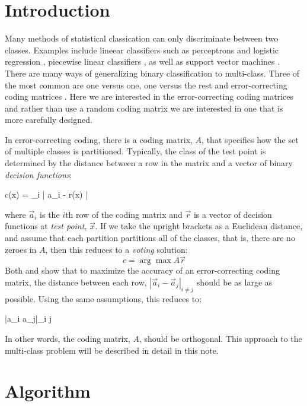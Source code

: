 
\section{Introduction}

Many methods of statistical classication can only discriminate between two classes. 
Examples include lineear classifiers such as perceptrons and logistic regression \citep{Michie_etal1994}, 
piecewise linear classifiers \citep{Herman_Yeung1992,Mills2011},
as well as support vector machines \citep{kernel_intro}.
There are many ways of generalizing binary classification to 
multi-class.
Three of the most common are one versus one, one versus the rest and 
error-correcting coding matrices \citep{Hsu_Lin2002}.
Here we are interested in the error-correcting coding matrices
\citep{Dietterich_Bakiri1995, Windeatt_Ghaderi2002} and
rather than use a random coding matrix we are interested in one that is
more carefully designed.

In error-correcting coding, there is a coding matrix, $A$, that specifies
how the set of multiple classes is partitioned.
Typically, the class of the test point is determined by the distance between
a row in the matrix and a vector of binary {\it decision functions}:
\begin{eqnnon}
	c(\vec x) = \arg \min_i | \vec a_i - \vec r(\vec x) |
	\label{min_dist}
\end{eqnnon}
where $\vec a_i$ is the $i$th row of the coding matrix and $\vec r$
is a vector of decision functions at {\it test point}, $\vec x$.
If we take the upright brackets as a Euclidean distance, and assume that
each partition partitions all of the classes, that is, there are no zeroes
in $A$, then this reduces to a {\it voting} solution:
\begin{equation}
	c = \arg \max A \vec r \label{voting}
\end{equation}
Both \citet{Allwein_etal2000} and \citet{Windeatt_Ghaderi2002} show that to
maximize the accuracy of an error-correcting coding matrix, the distance
between each row, $|\vec a_i - \vec a_j|_{i \ne j}$ should be as
large as possible.
Using the same assumptions, this reduces to:
\begin{eqnnon}
	\min |\vec a_i \cdot \vec a_j|_{i \ne j}
\end{eqnnon}
In other words, the coding matrix, $A$, should be orthogonal.
This approach to the multi-class problem will be described in detail in this note.

\section{Algorithm}

